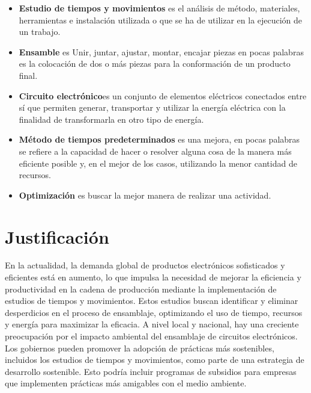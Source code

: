     \begin{itemize}
    \item \textbf{{Estudio de tiempos y movimientos}} es el análisis de método, materiales, herramientas e instalación utilizada o que se ha de utilizar en la ejecución de un trabajo. \cite{RAE}
    \item \textbf{Ensamble} es Unir, juntar, ajustar, montar, encajar piezas en pocas palabras es la colocación de dos o más piezas para la conformación de un producto final. \cite{RAE}
    \item \textbf {Circuito electrónico}es un conjunto de elementos eléctricos conectados entre sí que permiten generar, transportar y utilizar la energía eléctrica con la finalidad de transformarla en otro tipo de energía. \cite{RAE}
    \item \textbf{Método de tiempos predeterminados} es una mejora, en pocas palabras se refiere a la capacidad de hacer o resolver alguna cosa de la manera más eficiente posible y, en el mejor de los casos, utilizando la menor cantidad de recursos. \cite{RAE}
    \item \textbf{Optimización} es buscar la mejor manera de realizar una actividad. \cite{RAE}
    \end{itemize}
    
    \section{Justificación}
    
    
    En la actualidad, la demanda global de productos electrónicos sofisticados y eficientes está en aumento, lo que impulsa la necesidad de mejorar la eficiencia y productividad en la cadena de producción mediante la implementación de estudios de tiempos y movimientos. Estos estudios buscan identificar y eliminar desperdicios en el proceso de ensamblaje, optimizando el uso de tiempo, recursos y energía para maximizar la eficacia.
    A nivel local y nacional, hay una creciente preocupación por el impacto ambiental del ensamblaje de circuitos electrónicos. Los gobiernos pueden promover la adopción de prácticas más sostenibles, incluidos los estudios de tiempos y movimientos, como parte de una estrategia de desarrollo sostenible. Esto podría incluir programas de subsidios para empresas que implementen prácticas más amigables con el medio ambiente.
    
